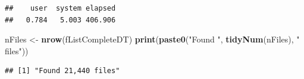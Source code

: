 \documentclass[]{article}
\newenvironment{Shaded}{\begin{snugshade}}{\end{snugshade}}
\newcommand{\KeywordTok}[1]{\textcolor[rgb]{0.13,0.29,0.53}{\textbf{#1}}}
\newcommand{\StringTok}[1]{\textcolor[rgb]{0.31,0.60,0.02}{#1}}
\newcommand{\NormalTok}[1]{#1}
\begin{document}
\begin{verbatim}
##    user  system elapsed 
##   0.784   5.003 406.906
\end{verbatim}

\begin{Shaded}
\begin{Highlighting}[]
\NormalTok{nFiles <-}\StringTok{ }\KeywordTok{nrow}\NormalTok{(fListCompleteDT)}
\KeywordTok{print}\NormalTok{(}\KeywordTok{paste0}\NormalTok{(}\StringTok{"Found "}\NormalTok{, }\KeywordTok{tidyNum}\NormalTok{(nFiles), }\StringTok{" files"}\NormalTok{))}
\end{Highlighting}
\end{Shaded}

\begin{verbatim}
## [1] "Found 21,440 files"
\end{verbatim}
\end{document}
